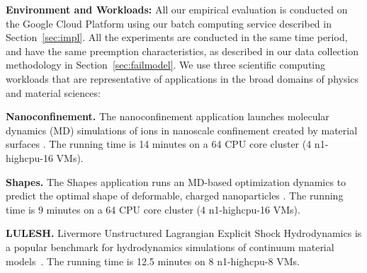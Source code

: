 \noindent \textbf{Environment and Workloads:}
All our empirical evaluation is conducted on the Google Cloud Platform using our batch computing service described in Section~\ref{sec:impl}. 
All the experiments are conducted in the same time period, and have the same preemption characteristics, as described in our data collection methodology in  Section~\ref{sec:failmodel}. 
%
We use three scientific computing workloads that are representative of  applications in the broad domains of physics and material sciences:%


\noindent \textbf{Nanoconfinement.}
The nanoconfinement application launches molecular dynamics (MD) simulations of ions in nanoscale confinement created by material surfaces \cite{jing2015ionic,kadupitiya2017}. The running time is 14 minutes on a 64 CPU core cluster (4 n1-highcpu-16 VMs). 

\noindent \textbf{Shapes.} The Shapes application runs an MD-based optimization dynamics to predict the optimal shape of deformable, charged nanoparticles \cite{jto1,brunk2019computational,brunk2020}. The running time is 9 minutes on a 64 CPU core cluster (4 n1-highcpu-16 VMs). 

\noindent \textbf{LULESH.} Livermore Unstructured Lagrangian Explicit Shock Hydrodynamics is a popular benchmark 
for hydrodynamics simulations of continuum material models~\cite{IPDPS13:LULESH,LULESH2:changes}. The running time is 12.5 minutes on 8 n1-highcpu-8 VMs.





